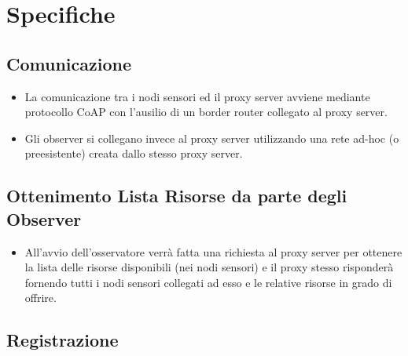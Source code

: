\chapter{Specifiche}
	\section{Comunicazione}

    \begin{itemize}
      \item La comunicazione tra i nodi sensori ed il proxy server avviene mediante protocollo CoAP con l’ausilio di un border router collegato al proxy server.
      \item Gli observer si collegano invece al proxy server utilizzando una rete ad-hoc (o preesistente) creata dallo stesso proxy server.
    \end{itemize}

  \section{Ottenimento Lista Risorse da parte degli Observer}

    \begin{itemize}
      \item All’avvio dell’osservatore verrà fatta una richiesta al proxy server per ottenere la lista delle risorse disponibili (nei nodi sensori) e il proxy stesso risponderà fornendo tutti i nodi sensori collegati ad esso e le relative risorse in grado di offrire.
    \end{itemize}

  \section{Registrazione}

